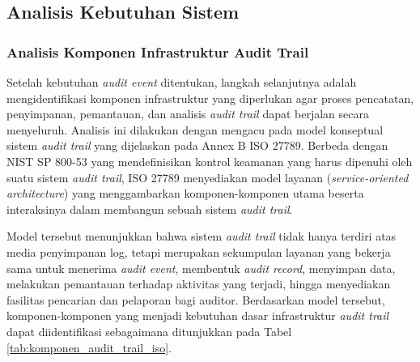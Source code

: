 \subsection{Analisis Kebutuhan Sistem}

\subsubsection{Analisis Komponen Infrastruktur Audit Trail}

Setelah kebutuhan \textit{audit event} ditentukan, langkah selanjutnya adalah mengidentifikasi komponen infrastruktur yang diperlukan agar proses pencatatan, penyimpanan, pemantauan, dan analisis \textit{audit trail} dapat berjalan secara menyeluruh. Analisis ini dilakukan dengan mengacu pada model konseptual sistem \textit{audit trail} yang dijelaskan pada Annex B ISO 27789. Berbeda dengan NIST SP 800-53 yang mendefinisikan kontrol keamanan yang harus dipenuhi oleh suatu sistem \textit{audit trail}, ISO 27789 menyediakan model layanan (\textit{service-oriented architecture}) yang menggambarkan komponen-komponen utama beserta interaksinya dalam membangun sebuah sistem \textit{audit trail}.

Model tersebut menunjukkan bahwa sistem \textit{audit trail} tidak hanya terdiri atas media penyimpanan log, tetapi merupakan sekumpulan layanan yang bekerja sama untuk menerima \textit{audit event}, membentuk \textit{audit record}, menyimpan data, melakukan pemantauan terhadap aktivitas yang terjadi, hingga menyediakan fasilitas pencarian dan pelaporan bagi auditor. Berdasarkan model tersebut, komponen-komponen yang menjadi kebutuhan dasar infrastruktur \textit{audit trail} dapat diidentifikasi sebagaimana ditunjukkan pada Tabel \ref{tab:komponen_audit_trail_iso}.

